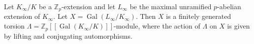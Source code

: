 Let $K_{\infty}/K$ be a $\mathbb{Z}_p$-extension and let $L_{\infty}$ be the maximal unramified $p$-abelian extension of $K_{\infty}$. Let $X = \operatorname{Gal}(L_{\infty}/K_{\infty})$. Then $X$ is a finitely generated torsion $\Lambda = \mathbb{Z}_p[[\operatorname{Gal}(K_{\infty}/K)]]$-module, where the action of $\Lambda$ on $X$ is given by lifting and conjugating automorphisms.

